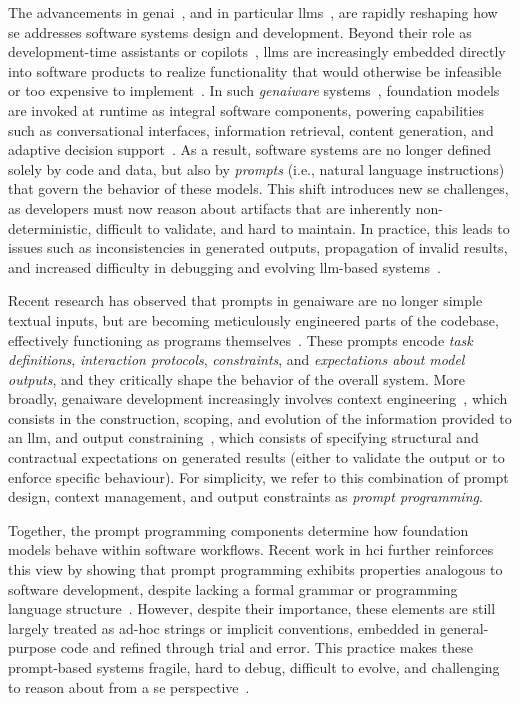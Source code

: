 \documentclass[manuscript,screen]{acmart}
\begin{document}
The advancements in \ac{genai}~\cite{llm_se_roadmap}, and in particular \acp{llm}~\cite{llm_survey}, are rapidly reshaping how \ac{se} addresses software systems design and development.
Beyond their role as development-time assistants or copilots~\cite{github2023copilot}, \acp{llm} are increasingly embedded directly into software products to realize functionality that would otherwise be infeasible or too expensive to implement~\cite{llm_se_roadmap}.
In such \emph{\ac{genai}ware} systems~\cite{llm_se_roadmap}, foundation models are invoked at runtime as integral software components, powering capabilities such as conversational interfaces, information retrieval, content generation, and adaptive decision support~\cite{DBLP:journals/corr/abs-2406-10300}.
As a result, software systems are no longer defined solely by code and data, but also by \emph{prompts} (i.e., natural language instructions) that govern the behavior of these models.
This shift introduces new \ac{se} challenges, as developers must now reason about artifacts that are inherently non-deterministic, difficult to validate, and hard to maintain.
In practice, this leads to issues such as inconsistencies in generated outputs, propagation of invalid results, and increased difficulty in debugging and evolving \ac{llm}-based systems~\cite{10.1145/3806396,DBLP:journals/tosem/ChenGCZL25,DBLP:conf/icsm/AbbassiSNK25}.

Recent research has observed that prompts in \ac{genai}ware are no longer simple textual inputs, but are becoming meticulously engineered parts of the codebase, effectively functioning as programs themselves~\cite{DBLP:journals/pacmse/LiangLRM25,llm_se_roadmap}.
These prompts encode \emph{task definitions}, \emph{interaction protocols}, \emph{constraints}, and \emph{expectations about model outputs}, and they critically shape the behavior of the overall system.
More broadly, \ac{genai}ware development increasingly involves context engineering~\cite{DBLP:journals/corr/abs-2507-13334}, which consists in the construction, scoping, and evolution of the information provided to an \ac{llm}, and output constraining~\cite{DBLP:conf/emnlp/GengJP023,DBLP:conf/nips/ParkWBPD24}, which consists of specifying structural and contractual expectations on generated results (either to validate the output or to enforce specific behaviour).
For simplicity, we refer to this combination of prompt design, context management, and output constraints as \emph{prompt programming}.

Together, the prompt programming components determine how foundation models behave within software workflows.
Recent work in \ac{hci} further reinforces this view by showing that prompt programming exhibits properties analogous to software development, despite lacking a formal grammar or programming language structure~\cite{10.1145/3544549.3585737}.
However, despite their importance, these elements are still largely treated as ad-hoc strings or implicit conventions, embedded in general-purpose code and refined through trial and error.
This practice makes these prompt-based systems fragile, hard to debug, difficult to evolve, and challenging to reason about from a \ac{se} perspective~\cite{llm_se_roadmap}.
\end{document}
